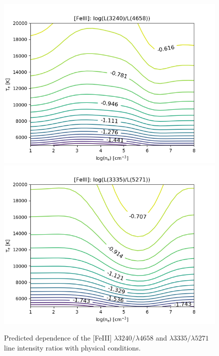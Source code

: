 \documentclass[twocolumn]{aastex63}
\begin{document}
\begin{figure}
\centering
\includegraphics[width=\columnwidth]{3240_4658.png}
\includegraphics[width=\columnwidth]{3335_5271.png}
\caption{Predicted dependence of the [Fe\thinspace III] $\lambda3240/\lambda4658$ and $\lambda3335/\lambda5271$
line intensity ratios with physical conditions.}
\label{fig:predicted_ratios_feiii}
\end{figure}
\end{document}
